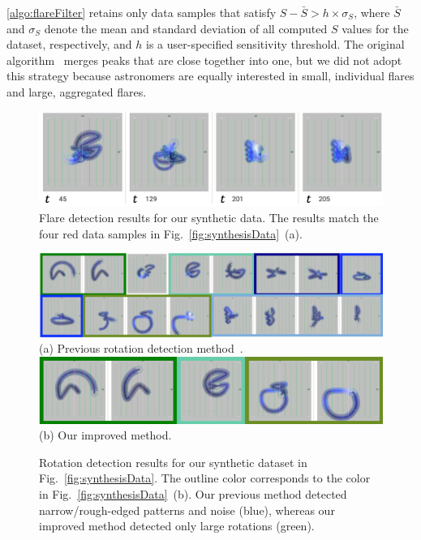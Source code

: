 \ref{algo:flareFilter} retains only data samples that satisfy $S - \bar{S} > h \times \sigma_{S}$, 
where $\bar{S}$ and $\sigma_{S}$ denote the mean and standard deviation of all computed $S$ values for the dataset, respectively, 
and $h$ is a user-specified sensitivity threshold. 
The original algorithm~\cite{Palshikar2009} merges peaks that are close together into one, 
but we did not adopt this strategy
because astronomers are equally interested in small, individual flares and large, aggregated flares.


\begin{figure}[tb]
    \centering
    \includegraphics[width=.85\linewidth]{vgtc_journal_latex/figures/flareDetectiondemodataResults.png}
    \caption{Flare detection results for our synthetic data. The results match the four red data samples in Fig.~\ref{fig:synthesisData}~(a).}
    \label{fig:flareDetection}
\end{figure}
\begin{figure}[tb]
    \centering
    \includegraphics[width=\linewidth]{vgtc_journal_latex/figures/rotationDetectiondemodataResultsOR.png}\\
    \footnotesize{\sf(a) Previous rotation detection method~\cite{Fujishiro2018}.}\\
    \vspace{5px}
    \includegraphics[width=.8\linewidth]{vgtc_journal_latex/figures/rotationDetectiondemodataResults.png}\\
    \footnotesize{\sf(b) Our improved method.}
    \caption{Rotation detection results for our synthetic dataset in Fig.~\ref{fig:synthesisData}. 
        The outline color corresponds to the color in Fig.~\ref{fig:synthesisData}~(b).
        Our previous method detected narrow/rough-edged patterns and noise (blue), 
        whereas our improved method detected only large rotations (green).}
    \label{fig:rotationResults}
\end{figure}

